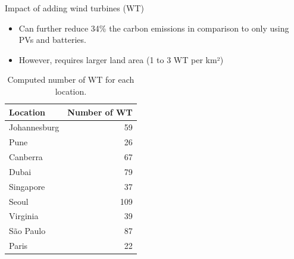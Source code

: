 \documentclass[Ligatures=TeX,table,svgnames,usetotalslideindicator,compress,10pt,aspectratio=169]{beamer}
\begin{document}
\begin{frame}{Impact of adding wind turbines (WT) }



  \begin{itemize}    
     \item  Can further reduce 34\% the carbon emissions in comparison to only using PVs and batteries.
     \item However, requires larger land area (1 to 3 WT per km²)
  \end{itemize}
  \begin{table}[h]
  \caption{Computed number of WT for each location.}\label{tab:results_wt} \centering
  \begin{tabular}{|l|r|}
  \hline
    
  \textbf{Location} &   \textbf{Number of WT} \\
  \hline
  Johannesburg & 59   \\
  \hline
  Pune         & 26 \\
  \hline
  Canberra    & 67 \\
  \hline
  Dubai       &  79  \\
  \hline
  Singapore   & 37 \\
  \hline     
  Seoul       & 109  \\
  \hline
  Virginia   & 39 \\
  \hline
  São Paulo   & 87 \\
  \hline 
  Paris    &   22 \\
  \hline
  
\end{tabular}  
\end{table}

\end{frame}
\end{document}
